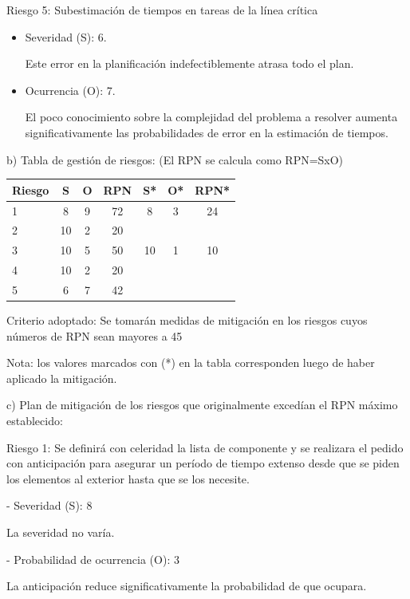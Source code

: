 \documentclass[
11pt, %
codirector, %
]{charter}
\begin{document}
Riesgo 5: Subestimación de tiempos en tareas de la línea crítica
\begin{itemize}
	\item Severidad (S): 6.

	      Este error en la planificación indefectiblemente atrasa todo el plan.

	\item Ocurrencia (O): 7.

	      El poco conocimiento sobre la complejidad del problema a resolver aumenta significativamente las probabilidades de error en la estimación de tiempos.
\end{itemize}
b) Tabla de gestión de riesgos:      (El RPN se calcula como RPN=SxO)
\begin{table}[htpb]
	\centering
	\begin{tabularx}{\linewidth}{@{}|X|c|c|c|c|c|c|@{}}
		\hline
		\rowcolor[HTML]{C0C0C0}
		Riesgo & S  & O & RPN & S* & O* & RPN* \\ \hline
		1      & 8  & 9 & 72  & 8  & 3  & 24   \\ \hline
		2      & 10 & 2 & 20  &    &    &      \\ \hline
		3      & 10 & 5 & 50  & 10 & 1  & 10   \\ \hline
		4      & 10 & 2 & 20  &    &    &      \\ \hline
		5      & 6  & 7 & 42  &    &    &      \\ \hline
	\end{tabularx}%
\end{table}

Criterio adoptado:
Se tomarán medidas de mitigación en los riesgos cuyos números de RPN sean mayores a 45

Nota: los valores marcados con (*) en la tabla corresponden luego de haber aplicado la mitigación.

c) Plan de mitigación de los riesgos que originalmente excedían el RPN máximo establecido:

Riesgo 1: Se definirá con celeridad la lista de componente y se realizara el pedido con anticipación para asegurar un período de tiempo extenso desde que se piden los elementos al exterior hasta que se los necesite.

- Severidad (S): 8

La severidad no varía.

- Probabilidad de ocurrencia (O): 3

La anticipación reduce significativamente la probabilidad de que ocupara.
\end{document}
